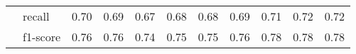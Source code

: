 \begin{tabular}{llrrrrrrrrr}
                 & recall &                    0.70 &                    0.69 &                    0.67 &                    0.68 &                    0.68 &                    0.69 &                    0.71 &                    0.72 &                    0.72 \\
                 & f1-score &                    0.76 &                    0.76 &                    0.74 &                    0.75 &                    0.75 &                    0.76 &                    0.78 &                    0.78 &                    0.78 \\
\bottomrule
\end{tabular}
